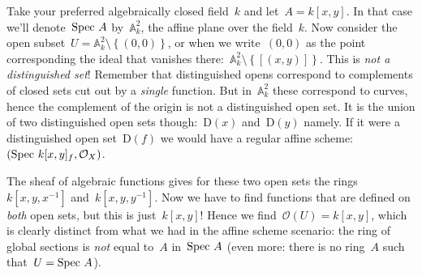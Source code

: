 \begin{example}
  Take your preferred algebraically closed field~$k$ and let~$A=k[x,y]$. In that case we'll denote~$\operatorname{Spec\,} A$ by~$\mathbb{A}^2_k$, the affine plane over the field~$k$. Now consider the open subset~$U=\mathbb{A}^2_k\setminus\left\{ (0,0) \right\}$, or when we write~$(0,0)$ as the point corresponding the ideal that vanishes there:~$\mathbb{A}^2_k\setminus\left\{ \left[ (x,y) \right] \right\}$. This is \emph{not a distinguished set}! Remember that distinguished opens correspond to complements of closed sets cut out by a \emph{single} function. But in~$\mathbb{A}^2_k$ these correspond to curves, hence the complement of the origin is not a distinguished open set. It is the union of two distinguished open sets though:~$\mathrm{D}(x)$ and~$\mathrm{D}(y)$ namely. If it were a distinguished open set~$\mathrm{D}(f)$ we would have a regular affine scheme: $(\operatorname{Spec\,} k[x,y]_f,\mathcal{O}_X)$.

  The sheaf of algebraic functions gives for these two open sets the rings~$k[x,y,x^{-1}]$ and~$k[x,y,y^{-1}]$. Now we have to find functions that are defined on \emph{both} open sets, but this is just~$k[x,y]$! Hence we find~$\mathcal{O}(U)=k[x,y]$, which is clearly distinct from what we had in the affine scheme scenario: the ring of global sections is \emph{not} equal to~$A$ in~$\operatorname{Spec\,} A$ (even more: there is no ring~$A$ such that~$U=\operatorname{Spec\,} A$).
\end{example}

